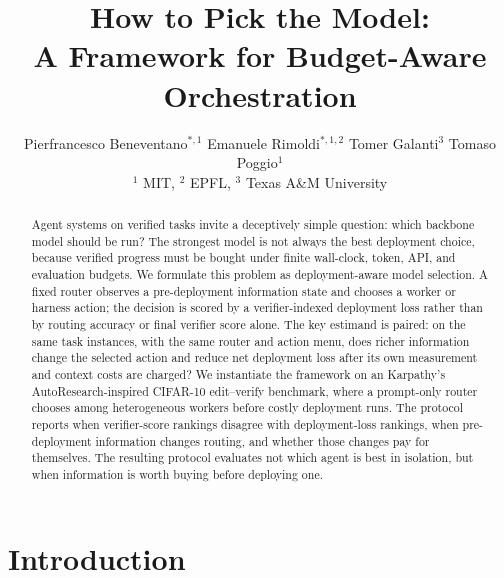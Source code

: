 \documentclass{article}
\title{How to Pick the Model:\\
A Framework for Budget-Aware Orchestration}
\author{%
  \!\!\!\!\!
  Pierfrancesco Beneventano$^{*,1}$ \quad Emanuele Rimoldi$^{*,1,2}$ \quad Tomer Galanti$^3$ \quad Tomaso Poggio$^1$ \\
  $^1$ MIT, $^2$ EPFL, $^3$ Texas A\&M University
}
\begin{document}
\maketitle

\begin{abstract}
Agent systems on verified tasks invite a deceptively simple question: which backbone model should be run? The strongest model is not always the best deployment choice, because verified progress must be bought under finite wall-clock, token, API, and evaluation budgets. We formulate this problem as deployment-aware model selection. A fixed router observes a pre-deployment information state and chooses a worker or harness action; the decision is scored by a verifier-indexed deployment loss rather than by routing accuracy or final verifier score alone. The key estimand is paired: on the same task instances, with the same router and action menu, does richer information change the selected action and reduce net deployment loss after its own measurement and context costs are charged? We instantiate the framework on an Karpathy's AutoResearch-inspired CIFAR-10 edit--verify benchmark, where a prompt-only router chooses among heterogeneous workers before costly deployment runs. The protocol reports when verifier-score rankings disagree with deployment-loss rankings, when pre-deployment information changes routing, and whether those changes pay for themselves. The resulting protocol evaluates not which agent is best in isolation, but when information is worth buying before deploying one.
\end{abstract}

\section{Introduction}
\label{sec:intro}
\end{document}
